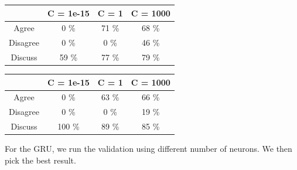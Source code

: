 \documentclass[11.5pt]{article}
\begin{document}
\begin{table}[h!]
  \centering
  \begin{tabular} 
    {|c|c|c|c|}
    \hline
     & C = 1e-15 & C = 1 & C = 1000 \\
    \hline
    Agree & 0 \% & 71 \% & 68 \% \\
    \hline
    Disagree & 0 \% & 0 \% & 46 \% \\
    \hline
    Discuss & 59 \% & 77 \% & 79 \% \\
    \hline
  \end{tabular}
  \begin{tabular} 
    {|c|c|c|c|}
    \hline
     & C = 1e-15 & C = 1 & C = 1000 \\
    \hline
    Agree & 0 \% & 63 \% & 66 \% \\
    \hline
    Disagree & 0 \% & 0 \% & 19 \% \\
    \hline
    Discuss & 100 \% & 89 \% & 85 \% \\
    \hline
  \end{tabular}
\end{table}

For the GRU, we run the validation using different number of neurons. We then pick the best result.
\end{document}
